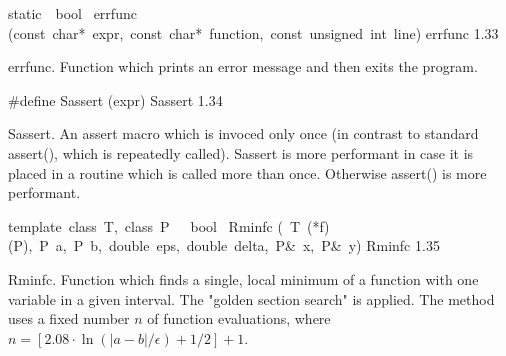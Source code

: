 \documentclass{article}
\begin{document}
\begin{cxxentry}
\begin{cxxfunction}
\begin{cxxdoc}
\end{cxxdoc}
\end{cxxfunction}
\begin{cxxfunction}
{static\ \ bool\ }
        {errfunc}
        {(const\ char*\ expr,\ const\ char*\ function,\ const\ unsigned\ int\ line)}
        {errfunc}
        {1.33}
\begin{cxxdoc}
errfunc.
Function which prints an error message and then exits the program.


\end{cxxdoc}
\end{cxxfunction}
\begin{cxxmacro}
{\#define}
        {Sassert}
        {(expr)}
        {Sassert}
        {1.34}
\begin{cxxdoc}
Sassert.
An assert macro which is invoced only once (in contrast
to standard assert(), which is repeatedly called).
Sassert is more performant in case it is placed in a routine
which is called more than once. Otherwise assert() is more
performant.


\end{cxxdoc}
\end{cxxmacro}
\begin{cxxfunction}
{template\ \<class\ T,\ class\ P\>\ \ \ bool\ }
        {Rminfc}
        {(\ T\ (*f)(P),\ P\ a,\ P\ b,\ double\ eps,\ double\ delta,\ P\&\ x,\ P\&\ y)}
        {Rminfc}
        {1.35}
\begin{cxxdoc}
Rminfc. 
Function which finds a single, local minimum of a function with one
variable in a given interval. The "golden section search" is applied. The
method uses a fixed number $n$ of function evaluations, where 
$n = [2.08\cdot\ln(|a-b|/\epsilon)+1/2] + 1$. 



\end{cxxdoc}
\end{cxxfunction}
\end{cxxentry}
\end{document}

